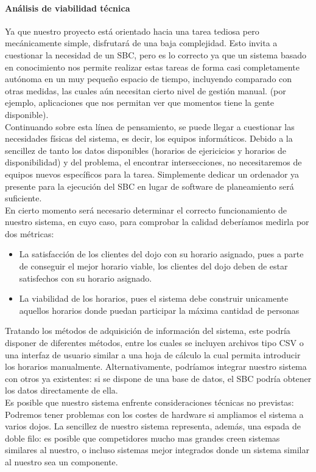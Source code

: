\documentclass[12pt,a4paper,twoside,spanish]{article}      %
\begin{document}
       \paragraph{Análisis de viabilidad técnica} 
       Ya que nuestro proyecto está orientado hacia una tarea tediosa pero mecánicamente simple, disfrutará de una baja complejidad. Esto invita a cuestionar
       la necesidad de un SBC, pero es lo correcto ya que un sistema basado en conocimiento nos permite realizar estas tareas de forma casi completamente autónoma
       en un muy pequeño espacio de tiempo, incluyendo comparado con otras medidas, las cuales aún necesitan cierto nivel de gestión manual.
       (por ejemplo, aplicaciones que nos permitan ver que momentos tiene la gente disponible).\\
       Continuando sobre esta línea de pensamiento, se puede llegar a cuestionar las necesidades físicas del sistema, es decir, los equipos informáticos. Debido a la sencillez
       de tanto los datos disponibles (horarios de ejericicios y horarios de disponibilidad) y del problema, el encontrar intersecciones, no necesitaremos de equipos nuevos
       específicos para la tarea. Simplemente dedicar un ordenador ya presente para la ejecución del SBC en lugar de software de planeamiento será suficiente.\\
       En cierto momento será necesario determinar el correcto funcionamiento de nuestro sistema, en cuyo caso, para comprobar la calidad deberíamos medirla por dos métricas:
       \begin{itemize}
       \item La satisfacción de los clientes del dojo con su horario asignado, pues a parte de conseguir el mejor horario viable, los clientes del dojo deben de estar
         satisfechos con su horario asignado.
       \item La viabilidad de los horarios, pues el sistema debe construir unicamente aquellos horarios donde puedan participar la máxima cantidad de personas
       \end{itemize} 
       Tratando los métodos de adquisición de información del sistema, este podría disponer de diferentes métodos, entre los cuales se incluyen archivos tipo CSV o una
       interfaz de usuario similar a una hoja de cálculo la cual permita introducir los horarios manualmente. Alternativamente, podríamos integrar nuestro sistema con otros
       ya existentes: si se dispone de una base de datos, el SBC podría obtener los datos directamente de ella.\\
       Es posible que nuestro sistema enfrente consideraciones técnicas no previstas: Podremos tener problemas con los costes de hardware si ampliamos el sistema a varios dojos.
       La sencillez de nuestro sistema representa, además, una espada de doble filo: es posible que competidores mucho mas grandes creen sistemas similares al nuestro, o incluso sistemas mejor integrados donde un sistema similar al nuestro sea un componente.
\end{document}
